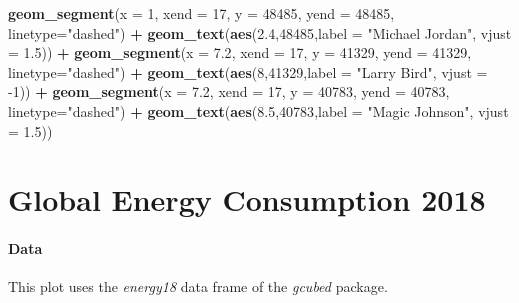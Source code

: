 \documentclass[]{book}
\newenvironment{Shaded}{\begin{snugshade}}{\end{snugshade}}
\newcommand{\DataTypeTok}[1]{\textcolor[rgb]{0.13,0.29,0.53}{#1}}
\newcommand{\DecValTok}[1]{\textcolor[rgb]{0.00,0.00,0.81}{#1}}
\newcommand{\FloatTok}[1]{\textcolor[rgb]{0.00,0.00,0.81}{#1}}
\newcommand{\KeywordTok}[1]{\textcolor[rgb]{0.13,0.29,0.53}{\textbf{#1}}}
\newcommand{\NormalTok}[1]{#1}
\newcommand{\OperatorTok}[1]{\textcolor[rgb]{0.81,0.36,0.00}{\textbf{#1}}}
\newcommand{\StringTok}[1]{\textcolor[rgb]{0.31,0.60,0.02}{#1}}
\begin{document}
\begin{Shaded}
\begin{Highlighting}[]
\StringTok{  }\KeywordTok{geom_segment}\NormalTok{(}\DataTypeTok{x =} \DecValTok{1}\NormalTok{, }\DataTypeTok{xend =} \DecValTok{17}\NormalTok{, }\DataTypeTok{y =} \DecValTok{48485}\NormalTok{, }\DataTypeTok{yend =} \DecValTok{48485}\NormalTok{, }\DataTypeTok{linetype=}\StringTok{"dashed"}\NormalTok{) }\OperatorTok{+}\StringTok{ }
\StringTok{  }\KeywordTok{geom_text}\NormalTok{(}\KeywordTok{aes}\NormalTok{(}\FloatTok{2.4}\NormalTok{,}\DecValTok{48485}\NormalTok{,}\DataTypeTok{label =} \StringTok{"Michael Jordan"}\NormalTok{, }\DataTypeTok{vjust =} \FloatTok{1.5}\NormalTok{)) }\OperatorTok{+}
\StringTok{  }\KeywordTok{geom_segment}\NormalTok{(}\DataTypeTok{x =} \FloatTok{7.2}\NormalTok{, }\DataTypeTok{xend =} \DecValTok{17}\NormalTok{, }\DataTypeTok{y =} \DecValTok{41329}\NormalTok{, }\DataTypeTok{yend =} \DecValTok{41329}\NormalTok{, }\DataTypeTok{linetype=}\StringTok{"dashed"}\NormalTok{) }\OperatorTok{+}\StringTok{ }
\StringTok{  }\KeywordTok{geom_text}\NormalTok{(}\KeywordTok{aes}\NormalTok{(}\DecValTok{8}\NormalTok{,}\DecValTok{41329}\NormalTok{,}\DataTypeTok{label =} \StringTok{"Larry Bird"}\NormalTok{, }\DataTypeTok{vjust =} \DecValTok{-1}\NormalTok{)) }\OperatorTok{+}
\StringTok{  }\KeywordTok{geom_segment}\NormalTok{(}\DataTypeTok{x =} \FloatTok{7.2}\NormalTok{, }\DataTypeTok{xend =} \DecValTok{17}\NormalTok{, }\DataTypeTok{y =} \DecValTok{40783}\NormalTok{, }\DataTypeTok{yend =} \DecValTok{40783}\NormalTok{, }\DataTypeTok{linetype=}\StringTok{"dashed"}\NormalTok{) }\OperatorTok{+}
\StringTok{  }\KeywordTok{geom_text}\NormalTok{(}\KeywordTok{aes}\NormalTok{(}\FloatTok{8.5}\NormalTok{,}\DecValTok{40783}\NormalTok{,}\DataTypeTok{label =} \StringTok{"Magic Johnson"}\NormalTok{, }\DataTypeTok{vjust =} \FloatTok{1.5}\NormalTok{)) }
\end{Highlighting}
\end{Shaded}

\hypertarget{energy18}{%
\chapter*{Global Energy Consumption 2018}\label{energy18}}

\hypertarget{energy18data}{%
\subsubsection*{Data}\label{energy18data}}

This plot uses the \emph{energy18} data frame of the \emph{gcubed} package.
\end{document}
